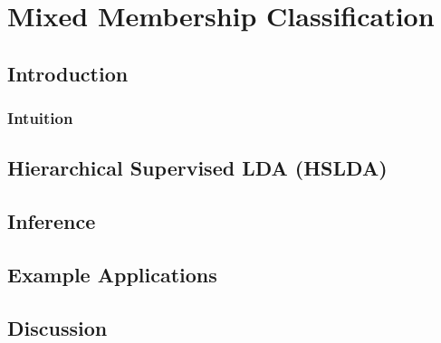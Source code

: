 

\chapter{Mixed Membership Classification}


\section{Introduction}

\label{sec:related_work} 

\subsection{Intuition}

\label{sec:introduction}


\section{Hierarchical Supervised LDA (HSLDA)}
\label{sec:model}


\section{Inference}
\label{sec:inference}




\section{Example Applications}

\label{sec:experiments}

\section{Discussion}
\label{sec:discussion}


